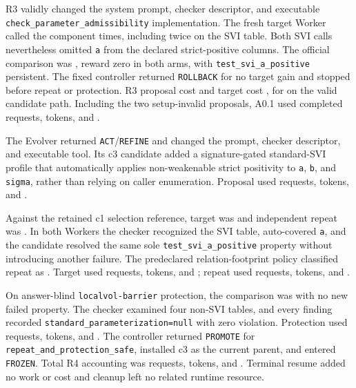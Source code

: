 R3 validly changed the system prompt, checker descriptor, and executable
\texttt{check\_parameter\_admissibility} implementation. The fresh target
Worker called the component \AOneRThreeComponentCalls{} times, including twice
on the SVI table. Both SVI calls nevertheless omitted \texttt{a} from the
declared strict-positive columns. The official comparison was
\AOneRThreeTarget{}, reward zero in both arms, with
\texttt{test\_svi\_a\_positive} persistent. The fixed controller returned
\texttt{ROLLBACK} for no target gain and stopped before repeat or protection.
R3 proposal cost \AOneRThreeProposalCost{} and target cost
\AOneRThreeTargetCost{}, for \AOneRThreeCost{} on the valid candidate path.
Including the two setup-invalid proposals, A0.1 used \AOnePathRequests{}
completed requests, \AOnePathTokens{} tokens, and \AOnePathCost{}.


 The Evolver returned \texttt{ACT}/\texttt{REFINE} and
changed the prompt, checker descriptor, and executable tool. Its c3 candidate
added a signature-gated standard-SVI profile that automatically applies
non-weakenable strict positivity to \texttt{a}, \texttt{b}, and
\texttt{sigma}, rather than relying on caller enumeration. Proposal used
\AZeroTwoProposalRequests{} requests, \AZeroTwoProposalTokens{} tokens, and
\AZeroTwoProposalCost{}.

Against the retained c1 selection reference, target was \AZeroTwoTarget{} and
independent repeat was \AZeroTwoRepeat{}. In both Workers the checker recognized
the SVI table, auto-covered \texttt{a}, and the candidate resolved the same
sole \texttt{test\_svi\_a\_positive} property without introducing another
failure. The predeclared relation-footprint policy classified repeat as
\AZeroTwoRepeatVerdict{}. Target used \AZeroTwoTargetRequests{} requests,
\AZeroTwoTargetTokens{} tokens, and \AZeroTwoTargetCost{}; repeat used
\AZeroTwoRepeatRequests{} requests, \AZeroTwoRepeatTokens{} tokens, and
\AZeroTwoRepeatCost{}.

On answer-blind \texttt{localvol-barrier} protection, the comparison was
\AZeroTwoProtection{} with no new failed property. The checker examined four
non-SVI tables, and every finding recorded
\texttt{standard\_parameterization=null} with zero violation. Protection used
\AZeroTwoProtectionRequests{} requests, \AZeroTwoProtectionTokens{} tokens,
and \AZeroTwoProtectionCost{}. The controller returned \texttt{PROMOTE} for
\texttt{repeat\_and\_protection\_safe}, installed c3 as the current parent,
and entered \texttt{FROZEN}. Total R4 accounting was
\AZeroTwoTotalRequests{} requests, \AZeroTwoTotalTokens{} tokens, and
\AZeroTwoTotalCost{}. Terminal resume added no work or cost and cleanup left no
related runtime resource.

